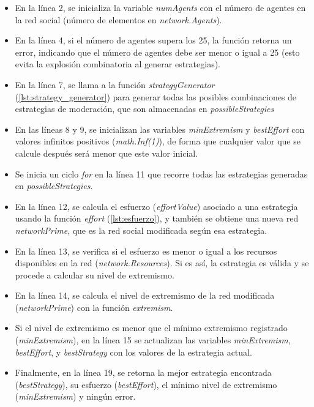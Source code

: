 \documentclass[letterpaper,10pt]{article}
\begin{document}
\begin{itemize}
  
  \item En la línea 2, se inicializa la variable \textit{numAgents} con el número de agentes en la red social (número de elementos en \textit{network.Agents}).
  \item En la línea 4, si el número de agentes supera los 25, la función retorna un error, indicando que el número de agentes debe ser menor o igual a 25 (esto evita la explosión combinatoria al generar estrategias).
  \item En la línea 7, se llama a la función \textit{strategyGenerator} (\ref{lst:strategy_generator}) para generar todas las posibles combinaciones de estrategias de moderación, que son almacenadas en \textit{possibleStrategies}
  \item En las líneas 8 y 9, se inicializan las variables \textit{minExtremism} y \textit{bestEffort} con valores infinitos positivos (\textit{math.Inf(1)}), de forma que cualquier valor que se calcule después será menor que este valor inicial.
  \item Se inicia un ciclo \textit{for} en la línea 11 que recorre todas las estrategias generadas en \textit{possibleStrategies}.
  \item En la línea 12, se calcula el esfuerzo (\textit{effortValue}) asociado a una estrategia usando la función \textit{effort} (\ref{lst:esfuerzo}), y también se obtiene una nueva red \textit{networkPrime}, que es la red social modificada según esa estrategia.
  \item En la línea 13, se verifica si el esfuerzo es menor o igual a los recursos disponibles en la red (\textit{network.Resources}). Si es así, la estrategia es válida y se procede a calcular su nivel de extremismo.
  \item En la línea 14, se calcula el nivel de extremismo de la red modificada (\textit{networkPrime}) con la función \textit{extremism}.
  \item Si el nivel de extremismo es menor que el mínimo extremismo registrado (\textit{minExtremism}), en la línea 15 se actualizan las variables \textit{minExtremism}, \textit{bestEffort}, y \textit{bestStrategy} con los valores de la estrategia actual.
  \item Finalmente, en la línea 19, se retorna la mejor estrategia encontrada (\textit{bestStrategy}), su esfuerzo (\textit{bestEffort}), el mínimo nivel de extremismo (\textit{minExtremism}) y ningún error.
\end{itemize}
\end{document}
